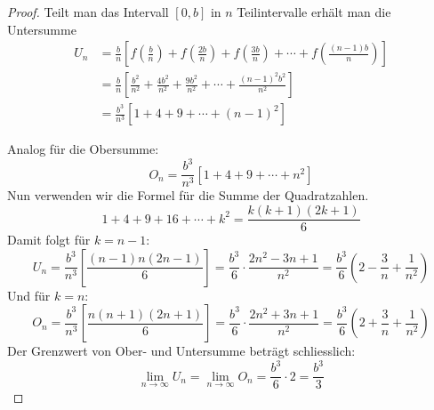 \begin{proof}
	Teilt man das Intervall $[0,b]$ in $n$ Teilintervalle erhält man die Untersumme
	\begin{align*}
		U_n & = \frac{b}{n} \left[f\left(\frac{b}{n} \right)+f\left(\frac{2b}{n} \right)+f\left(\frac{3b}{n} \right)+\cdots +f\left(\frac{(n-1)b}{n} \right)\right] \\
		    & =\frac{b}{n} \left[ \frac{b^2}{n^2} +\frac{4b^2}{n^2} + \frac{9b^2}{n^2} + \cdots +\frac{(n-1)^2 b^2}{n^2} \right]                                    \\
		    & = \frac{b^3}{n^3} \left[1+4+9+\cdots+(n-1)^2 \right]
	\end{align*}

	Analog für die Obersumme:
	$$ O_n=\frac{b^3}{n^3}  [1+4+9+\cdots +n^2 ]$$
	Nun verwenden wir die Formel für die Summe der Quadratzahlen.
	$$ 1+4+9+16+\cdots +k^2=\frac{k(k+1)(2k+1)}{6} $$
	Damit folgt für $k=n-1$:
	$$ U_n= \frac{b^3}{n^3} \left[ \frac{(n-1)n(2n-1)}{6} \right] =  \frac{b^3}{6} \cdot  \frac{2n^2-3n+1}{n^2} = \frac{b^3}{6} \left(2-\frac{3}{n}+\frac{1}{n^2}\right)
	$$
	Und für $k=n$:
	$$ O_n= \frac{b^3}{n^3} \left[ \frac{n(n+1)(2n+1)}{6} \right] =  \frac{b^3}{6} \cdot \frac{2n^2+3n+1}{n^2} = \frac{b^3}{6} \left(2+\frac{3}{n}+\frac{1}{n^2}\right)
	$$
	Der Grenzwert von Ober- und Untersumme beträgt schliesslich:
	$$ \lim_{n\rightarrow\infty} U_n = \lim_{n\rightarrow\infty} O_n = \frac{b^3}{6}\cdot 2 = \frac{b^3}{3}  $$
\end{proof}

%   

